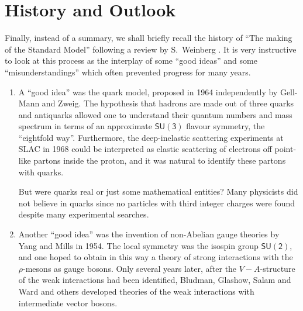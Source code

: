 \documentclass[12pt]{report}
\newcommand{\2}{\ensuremath{\sqrt{2}\,}}
\begin{document}
{%
      

    \chapter{History and Outlook}
      Finally, instead of a summary, we shall briefly recall the history of ``The making of the
      Standard Model'' following a review by S.~Weinberg \cite{Weinberg:2004kv}. It is very
      instructive to look at this process as the interplay of some ``good ideas'' and some
      ``misunderstandings'' which often prevented progress for many years.   

      \begin{enumerate}
        \item A ``good idea'' was the quark model, proposed in 1964 independently by Gell-Mann and
          Zweig. The hypothesis that hadrons are made out of three quarks and antiquarks allowed one
          to understand their quantum numbers and mass spectrum in terms of an approximate
          $\mathsf{SU(3)}$ flavour symmetry, the ``eightfold way''. Furthermore, the deep-inelastic
          scattering experiments at SLAC in 1968 could be interpreted as elastic scattering of
          electrons off point-like partons inside the proton, and it was natural to identify these
          partons with quarks.    

          But were quarks real or just some mathematical entities? Many physicists did not believe
          in quarks since no particles with third integer charges were found despite many
          experimental searches.

        
         \item Another ``good idea'' was the invention of non-Abelian gauge theories by Yang and Mills
           in 1954. The local symmetry was the isospin group $\mathsf{SU(2)}$, and one hoped to
           obtain in this way a theory of strong interactions with the $\rho$-mesons as gauge
           bosons. Only several years later, after the $V-A$-structure of the weak interactions
           had been identified, Bludman, Glashow, Salam and Ward and others developed theories of 
           the weak 
           interactions with intermediate vector bosons.


\end{enumerate}}
\end{document}
